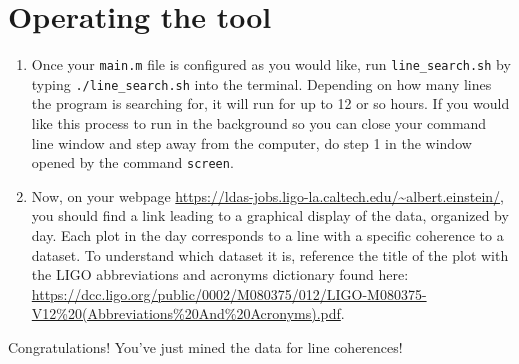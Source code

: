 \documentclass[11pt]{article}
\begin{document}
\section*{Operating the tool}
\begin{enumerate}
  \item Once your {\tt main.m} file is configured as you would like, run {\tt line\_search.sh} by typing {\tt ./line\_search.sh} into the terminal. Depending on how many lines the program is searching for, it will run for up to 12 or so hours. If you would like this process to run in the background so you can close your command line window and step away from the computer, do step 1 in the window opened by the command {\tt screen}.
	
\item Now, on your webpage \url{https://ldas-jobs.ligo-la.caltech.edu/~albert.einstein/}, you should find a link leading to a graphical display of the data, organized by day. Each plot in the day corresponds to a line with a specific coherence to a dataset. To understand which dataset it is, reference the title of the plot with the LIGO abbreviations and acronyms dictionary found here: \url{https://dcc.ligo.org/public/0002/M080375/012/LIGO-M080375-V12\%20(Abbreviations\%20And\%20Acronyms).pdf}.
\end{enumerate}

Congratulations! You've just mined the data for line coherences!
\end{document}

